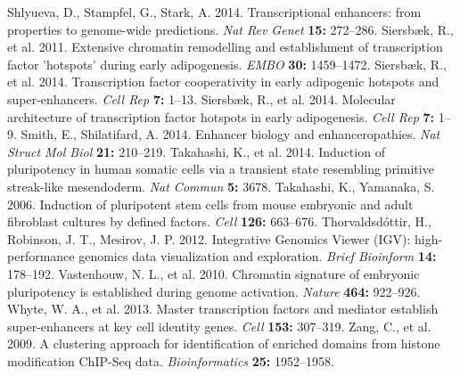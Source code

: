 \begin{thebibliography}{40}
	 Shlyueva, D., Stampfel, G., Stark, A. 2014. Transcriptional enhancers: from properties to genome-wide predictions. \emph{Nat Rev Genet} \textbf{15:} 272--286.
	 Siersb\ae k, R., et al. 2011. Extensive chromatin remodelling and establishment of transcription factor 'hotspots' during early adipogenesis. \emph{EMBO} \textbf{30:} 1459--1472.
	 Siersb\ae k, R., et al. 2014. Transcription factor cooperativity in early adipogenic hotspots and super-enhancers. \emph{Cell Rep} \textbf{7:} 1--13.
	 Siersb\ae k, R., et al. 2014. Molecular architecture of transcription factor hotspots in early adipogenesis. \emph{Cell Rep} \textbf{7:} 1--9.
	 Smith, E., Shilatifard, A. 2014. Enhancer biology and enhanceropathies. \emph{Nat Struct Mol Biol} \textbf{21:} 210--219.
	 Takahashi, K., et al. 2014. Induction of pluripotency in human somatic cells via a transient state resembling primitive streak-like mesendoderm. \emph{Nat Commun} \textbf{5:} 3678.
	 Takahashi, K., Yamanaka, S. 2006. Induction of pluripotent stem cells from mouse embryonic and adult fibroblast cultures by defined factors. \emph{Cell} \textbf{126:} 663--676.
	 Thorvaldsd\'ottir, H., Robinson, J. T., Mesirov, J. P. 2012. Integrative Genomics Viewer (IGV): high-performance genomics data visualization and exploration. \emph{Brief Bioinform} \textbf{14:} 178--192.
	 Vastenhouw, N. L., et al. 2010. Chromatin signature of embryonic pluripotency is established during genome activation. \emph{Nature} \textbf{464:} 922--926.
	 Whyte, W. A., et al. 2013. Master transcription factors and mediator establish super-enhancers at key cell identity genes. \emph{Cell} \textbf{153:} 307--319.
	 Zang, C., et al. 2009. A clustering approach for identification of enriched domains from histone modification ChIP-Seq data. \emph{Bioinformatics} \textbf{25:} 1952--1958.
\end{thebibliography}

